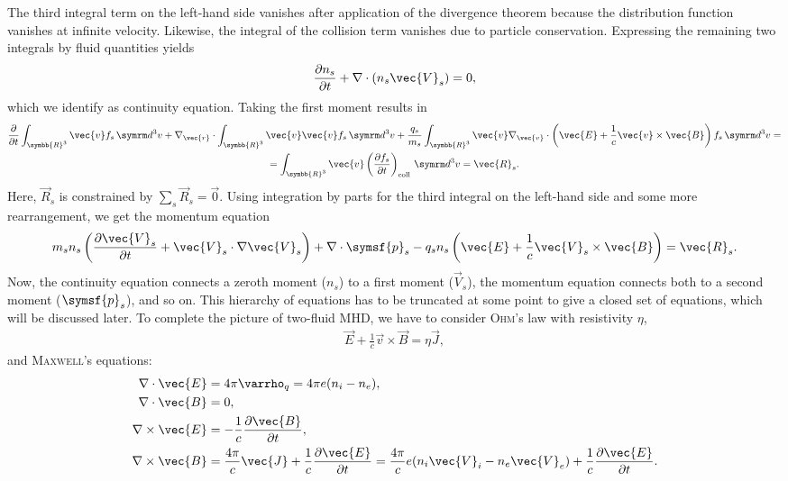 The third integral term on the left-hand side vanishes after application of the divergence theorem because the distribution function vanishes at infinite velocity. Likewise, the integral of the collision term vanishes due to particle conservation. Expressing the remaining two integrals by fluid quantities yields
\begin{gather}
  \pd[n_{s}]{t} + \divg (n_{s} \vec{V}_{s}) = 0, \label{eq:continuity}
\end{gather}
which we identify as continuity equation. Taking the first moment results in
\begin{multline}
  \pd{t} \int_{\symbb{R}^{3}} \vec{v} f_{s} \, \diff^{3} v + \nabla_{\vec{r}} \cdot \int_{\symbb{R}^{3}} \vec{v} \vec{v} f_{s} \, \diff^{3} v + \frac{q_{s}}{m_{s}} \int_{\symbb{R}^{3}} \vec{v} \nabla_{\vec{v}} \cdot \left ( \vec{E} + \frac{1}{c} \vec{v} \times \vec{B} \right ) f_{s} \, \diff^{3} v = \\ = \int_{\symbb{R}^{3}} \vec{v} \left ( \pd[f_{s}]{t} \right )_{\text{coll}} \, \diff^{3} v = \vec{R}_{s}.
\end{multline}
Here, $\vec{R}_{s}$ is constrained by $\sum_{s} \vec{R}_{s} = \vec{0}$. Using integration by parts for the third integral on the left-hand side and some more rearrangement, we get the momentum equation
\begin{gather}
  m_{s} n_{s} \left ( \pd[\vec{V}_{s}]{t} + \vec{V}_{s} \cdot \grad \vec{V}_{s} \right ) + \divg \symsf{p}_{s} - q_{s} n_{s} \left ( \vec{E} + \frac{1}{c} \vec{V}_{s} \times \vec{B} \right ) = \vec{R}_{s}. \label{eq:momentum}
\end{gather}
Now, the continuity equation connects a zeroth moment ($n_{s}$) to a first moment ($\vec{V}_{s}$), the momentum equation connects both to a second moment ($\symsf{p}_{s}$), and so on. This hierarchy of equations has to be truncated at some point to give a closed set of equations, which will be discussed later. To complete the picture of two-fluid MHD, we have to consider \textsc{Ohm}'s law with resistivity $\eta$,
\begin{gather}
  \vec{E} + \frac{1}{c} \vec{v} \times \vec{B} = \eta \vec{J},
\end{gather}
and \textsc{Maxwell}'s equations:
\begin{align}
  \divg \vec{E} &= 4 \pi \varrho_{q} = 4 \pi e (n_{i} - n_{e}), \label{eq:gauss_field} \\
  \divg \vec{B} &= 0, \label{eq:no_monopoles_field} \\
  \curl \vec{E} &= -\frac{1}{c} \pd[\vec{B}]{t}, \label{eq:faraday_field} \\
  \curl \vec{B} &= \frac{4 \pi}{c} \vec{J} + \frac{1}{c} \pd[\vec{E}]{t} = \frac{4 \pi}{c} e (n_{i} \vec{V}_{i} - n_{e} \vec{V}_{e}) + \frac{1}{c} \pd[\vec{E}]{t}. \label{eq:ampere_field}
\end{align}
